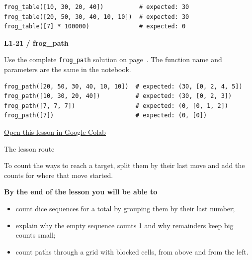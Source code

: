 \documentclass[11pt,a4paper]{article}
\newcommand{\topicflow}[2]{\par\Needspace{20\baselineskip}\bigskip\markboth{#2}{}{\color{quiet}\fontsize{9}{12}\selectfont\textbf{#1}}\par{\heavy\fontsize{19}{23}\selectfont\raggedright #2\par}\vspace{5pt}}
\newcommand{\lessonnumber}{0}\newcommand{\lessonheading}{Teacher Class Notes}\hypersetup{pdftitle={Dynamic Programming: From Recursion to Efficient Solutions - Teacher Class Notes},pdfauthor={fifteen02},bookmarksopen=true}
\begin{document}
\begin{lstlisting}
frog_table([10, 30, 20, 40])          # expected: 30
frog_table([20, 50, 30, 40, 10, 10])  # expected: 30
frog_table([7] * 100000)              # expected: 0
\end{lstlisting}
\textbf{L1-21 / frog\_path}\par
Use the complete \texttt{frog\_path} solution on page~\pageref{L1-code-frog_path}. The function name and parameters are the same in the notebook.

\begin{lstlisting}
frog_path([20, 50, 30, 40, 10, 10])  # expected: (30, [0, 2, 4, 5])
frog_path([10, 30, 20, 40])          # expected: (30, [0, 2, 3])
frog_path([7, 7, 7])                 # expected: (0, [0, 1, 2])
frog_path([7])                       # expected: (0, [0])
\end{lstlisting}
\clearpage\renewcommand{\lessonnumber}{2}\renewcommand{\lessonheading}{Lesson 2 · Dice Combinations and Grid Paths}\label{lesson-2}
\noindent{}\par\vspace{5mm}
\href{https://colab.research.google.com/github/fifteen02/julians-pathfinder/blob/main/Lesson\%202/lesson.ipynb}{\underline{Open this lesson in Google Colab}}\par
\topicflow{BEFORE CLASS}{The lesson route}
\par\noindent\colorbox{wash}{\parbox{\dimexpr\linewidth-2\fboxsep\relax}{\par{}\par\smallskip To count the ways to reach a target, split them by their last move and add the counts for where that move started.\par\medskip\textbf{By the end of the lesson you will be able to}\begin{itemize}\item count dice sequences for a total by grouping them by their last number;\item explain why the empty sequence counts 1 and why remainders keep big counts small;\item count paths through a grid with blocked cells, from above and from the left.\end{itemize}\vspace{3pt}}}\par
\end{document}
